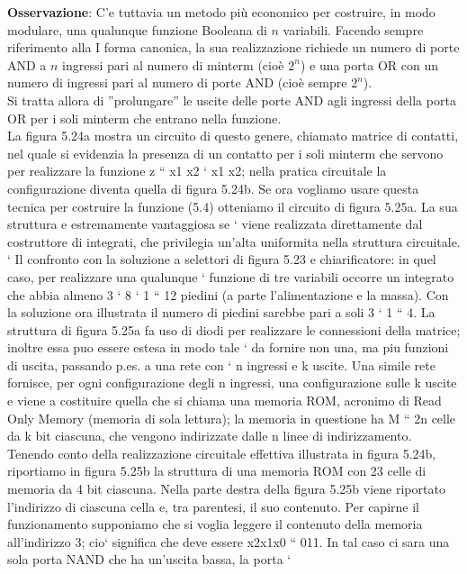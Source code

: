 \documentclass[a4paper]{extarticle}
\begin{document}
\vspace{1em}
\noindent
\textbf{Osservazione}: C’e tuttavia un metodo più economico per costruire, in modo modulare, una qualunque funzione Booleana di \(n\) variabili. Facendo sempre riferimento alla I forma canonica, la sua realizzazione richiede un numero di porte AND a \(n\) ingressi pari al numero di minterm (cioè \(2^n\)) e una porta OR con un numero di ingressi pari al numero di porte AND (cioè sempre \(2^n\)).\\
Si tratta allora di ”prolungare” le uscite delle porte AND agli ingressi della porta OR per i soli minterm che entrano nella funzione.\\
La figura 5.24a mostra un circuito di questo genere, chiamato matrice di contatti, nel quale
si evidenzia la presenza di un contatto per i soli minterm che servono per realizzare la funzione z “ x1 x2 ` x1 x2;
nella pratica circuitale la configurazione diventa quella di figura 5.24b. Se ora vogliamo usare questa tecnica per
costruire la funzione (5.4) otteniamo il circuito di figura 5.25a. La sua struttura e estremamente vantaggiosa se `
viene realizzata direttamente dal costruttore di integrati, che privilegia un’alta uniformita nella struttura circuitale. `
Il confronto con la soluzione a selettori di figura 5.23 e chiarificatore: in quel caso, per realizzare una qualunque `
funzione di tre variabili occorre un integrato che abbia almeno 3 ` 8 ` 1 “ 12 piedini (a parte l’alimentazione
e la massa). Con la soluzione ora illustrata il numero di piedini sarebbe pari a soli 3 ` 1 “ 4. La struttura di
figura 5.25a fa uso di diodi per realizzare le connessioni della matrice; inoltre essa puo essere estesa in modo tale `
da fornire non una, ma piu funzioni di uscita, passando p.es. a una rete con ` n ingressi e k uscite. Una simile rete
fornisce, per ogni configurazione degli n ingressi, una configurazione sulle k uscite e viene a costituire quella che
si chiama una memoria ROM, acronimo di Read Only Memory (memoria di sola lettura); la memoria in questione
ha M “ 2n celle da k bit ciascuna, che vengono indirizzate dalle n linee di indirizzamento. Tenendo conto della
realizzazione circuitale effettiva illustrata in figura 5.24b, riportiamo in figura 5.25b la struttura di una memoria
ROM con 23 celle di memoria da 4 bit ciascuna.
Nella parte destra della figura 5.25b viene riportato l’indirizzo di ciascuna cella e, tra parentesi, il suo contenuto.
Per capirne il funzionamento supponiamo che si voglia leggere il contenuto della memoria all’indirizzo 3; cio`
significa che deve essere x2x1x0 “ 011. In tal caso ci sara una sola porta NAND che ha un’uscita bassa, la porta `
\end{document}
